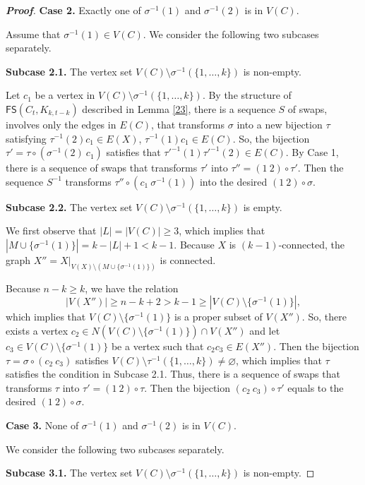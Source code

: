 \documentclass[11pt]{article}
\newcommand{\FS}{\mathsf{FS}}
\begin{document}
\begin{proof}[\bfseries{Proof}]
\vskip 2mm
\noindent\textbf{Case 2.}  Exactly one of $\sigma^{-1}(1)$ and $\sigma^{-1}(2)$ is in $V(C)$.
\vskip 2mm

 Assume that $\sigma^{-1}(1)\in V(C)$. We consider the following two subcases separately. 

\vskip 2mm
\noindent\textbf{Subcase 2.1.} The vertex set $ V(C)\setminus \sigma^{-1}(\{1,\dots,k\})$ is non-empty.
\vskip 2mm

 Let $c_1$ be a vertex in $ V(C)\setminus \sigma^{-1}(\{1,\dots,k\})$. By the structure of $\FS(C_t,K_{k,t-k})$ described in Lemma \ref{23},  there is a sequence  $S$  of swaps, involves only the edges in $E(C)$, that transforms $\sigma$ into a new bijection $\tau$ satisfying $\tau^{-1}(2)c_1 \in E(X)$, $\tau^{-1}(1)c_1\in E(C)$. So, the bijection $\tau'=\tau\circ (\sigma^{-1}(2) \ c_1)$ satisfies that $\tau'^{-1}(1)\tau'^{-1}(2) \in E(C)$. By Case 1, there is a sequence of swaps that transforms $\tau'$ into $\tau''=(1 \ 2)\circ \tau'$. Then the sequence $S^{-1}$ transforms $\tau'' \circ (c_1 \ \sigma^{-1}(1))$ into the desired $(1 \ 2)\circ \sigma$.
 
\vskip 2mm
\noindent\textbf{Subcase 2.2.}  The vertex set $ V(C)\setminus \sigma^{-1}(\{1,\dots,k\})$ is empty.
\vskip 2mm

We first observe that $|L|=|V(C)|\ge 3$, which implies that $|M\cup \{\sigma^{-1}(1)\}|=k-|L|+1<k-1$. Because $X$ is $(k-1)$-connected, the graph $X''=X|_{V(X)\setminus (M\cup \{\sigma^{-1}(1)\})}$ is connected.

 Because $n-k\ge k$, we have the relation 
$$|V(X'')|\ge n-k+2 >   k-1  \ge |V(C)\setminus \{\sigma^{-1}(1)\}|,$$
which implies that $V(C)\setminus \{\sigma^{-1}(1)\}$ is a proper subset of $V(X'')$. So, there exists a vertex $c_2\in N(V(C)\setminus \{\sigma^{-1}(1)\})\cap V(X'')$ and let $c_3\in V(C)\setminus \{\sigma^{-1}(1)\}$ be a vertex such that $c_2 c_3 \in E(X'')$. Then the bijection $\tau=\sigma\circ (c_2 \ c_3)$ satisfies  $V(C)\setminus \tau^{-1}(\{1,\dots,k\})\neq \varnothing$, which implies that $\tau$ satisfies the condition in Subcase 2.1. Thus, there is a sequence of swaps that transforms $\tau$ into $\tau'=(1 \ 2)\circ \tau$. Then the bijection $(c_2 \ c_3)\circ \tau'$ equals to the desired $(1 \ 2)\circ \sigma$.
 

\vskip 2mm
\noindent\textbf{Case 3.} None of $\sigma^{-1}(1)$ and $\sigma^{-1}(2)$ is in $V(C)$.
\vskip 2mm

We consider the following two subcases separately.

\vskip 2mm
\noindent\textbf{Subcase 3.1.} The vertex set $ V(C)\setminus \sigma^{-1}(\{1,\dots,k\})$ is non-empty.
\vskip 2mm


\end{proof}
\end{document}
